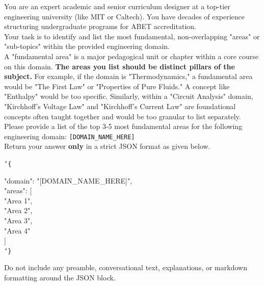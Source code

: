 \begin{tcolorbox}[
    colback=gray!5,
    colframe=gray!40,
    boxrule=0.4pt,
    arc=2pt,
    left=6pt,
    right=6pt,
    top=6pt,
    bottom=6pt,
    breakable
]
\ttfamily\small
You are an expert academic and senior curriculum designer at a top-tier engineering university (like MIT or Caltech). You have decades of experience structuring undergraduate programs for ABET accreditation. \\

Your task is to identify and list the most fundamental, non-overlapping "areas" or
"sub-topics" within the provided engineering domain. \\

A "fundamental area" is a major pedagogical unit or chapter within a core course on this domain. \textbf{The areas you list should be distinct pillars of the subject.} For example, if the domain is
"Thermodynamics," a fundamental area would be "The First Law" or
"Properties of Pure Fluids." A concept like "Enthalpy" would be
too specific. Similarly, within a "Circuit Analysis" domain, "Kirchhoff's Voltage Law" and "Kirchhoff's Current Law" are foundational concepts often taught together and would be too granular to list separately. \\

Please provide a list of the top 3-5 most fundamental areas for
the following engineering domain:
\texttt{[DOMAIN\_NAME\_HERE]} \\

Return your answer \textbf{only} in a strict JSON format as given below.

\vspace{8pt}
\noindent\bgroup\ttfamily
\texttt{\char`\{}

\vspace{4pt}
\hspace*{1em}"domain": "[DOMAIN\_NAME\_HERE]",\\
\hspace*{1em}"areas": [\\
\hspace*{2em}"Area 1",\\
\hspace*{2em}"Area 2",\\
\hspace*{2em}"Area 3",\\
\hspace*{2em}"Area 4"\\
\hspace*{1em}]\\
\texttt{\char`\}}
\egroup
\vspace{8pt}

Do not include any preamble, conversational text, explanations, or markdown formatting around the JSON block.
\end{tcolorbox}

